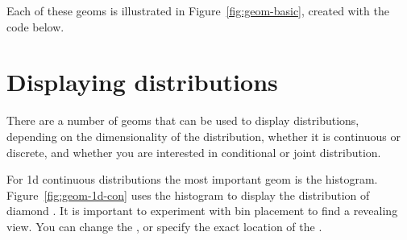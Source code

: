 \noindent Each of these geoms is illustrated in Figure~\ref{fig:geom-basic}, created with the code below.

% 


\section{Displaying distributions}\label{sec:distributions}

There are a number of geoms that can be used to display distributions, depending on the dimensionality of the distribution, whether it is continuous or discrete, and whether you are interested in conditional or joint distribution. 

For 1d continuous distributions the most important geom is the histogram.  Figure~\ref{fig:geom-1d-con} uses the histogram to display the distribution of diamond .  It is important to experiment with bin placement to find a revealing view. You can change the , or specify the exact location of the .    

% 


